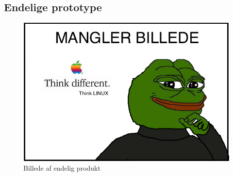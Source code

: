 \subsection{Endelige prototype}\label{subs:endeligProto}
\begin{figure}[H]
	\centering
    \includegraphics[width=13cm]{figures/stock.jpg}
	\caption{Billede af endelig produkt}
	\label{fig:endeligPrototype}
\end{figure}




